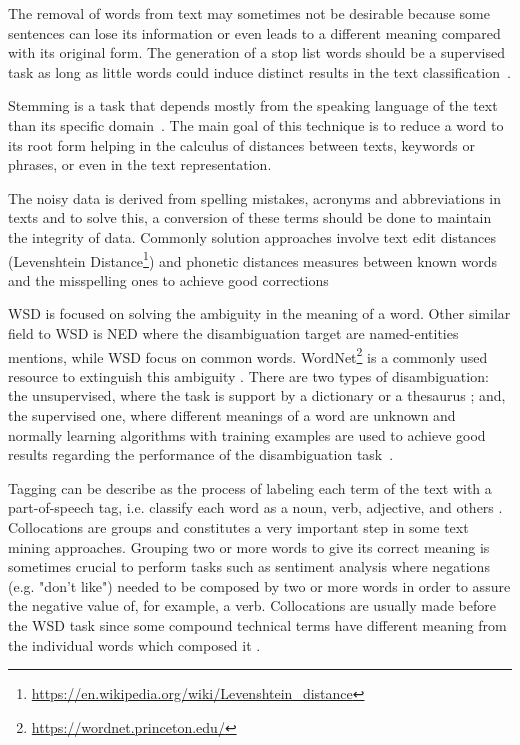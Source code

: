 The removal of words from text may sometimes not be desirable because some sentences can lose its information or even leads to a different meaning compared with its original form. The generation of a stop list words should be a supervised task as long as little words could induce distinct results in the text classification~\cite{kn:Riloff1995}.

Stemming is a task that depends mostly from the speaking language of the text than its specific domain~\cite{kn:Stavrianou2007}. The main goal of this technique is to reduce a word to its root form helping in the calculus of distances between texts, keywords or phrases, or even in the text representation.

The noisy data is derived from spelling mistakes, acronyms and abbreviations in texts and to solve this, a conversion of these terms should be done to maintain the integrity of data. Commonly solution approaches involve text edit distances (Levenshtein Distance\footnote{\url{https://en.wikipedia.org/wiki/Levenshtein_distance}}) and phonetic distances measures between known words and the misspelling ones to achieve good corrections~\cite{kn:Bontcheva2013} 

\gls{WSD} is focused on solving the ambiguity in the meaning of a word. Other similar field to \gls{WSD} is \gls{NED} where the disambiguation target are named-entities mentions, while \gls{WSD} focus on common words. WordNet\footnote{\url{https://wordnet.princeton.edu/}} is a commonly used resource to extinguish this ambiguity \cite{kn:Chang2016}. There are two types of disambiguation: the unsupervised, where the task is support by a dictionary or a thesaurus \cite{kn:Stavrianou2007}; and, the supervised one, where different meanings of a word are unknown and normally learning algorithms with training examples are used to achieve good results regarding the performance of the disambiguation task~\cite{kn:Yarowsky1995}.

Tagging can be describe as the process of labeling each term of the text with a part-of-speech tag, i.e. classify each word as a noun, verb, adjective, and others \cite{kn:Hotho2005}. Collocations are groups and constitutes a very important step in some text mining approaches. Grouping two or more words to give its correct meaning is sometimes crucial to perform tasks such as sentiment analysis where negations (e.g. "don't like") needed to be composed by two or more words in order to assure the negative value of, for example, a verb. Collocations are usually made before the \gls{WSD} task since some compound technical terms have different meaning from the individual words which composed it \cite{kn:Stavrianou2007}.

